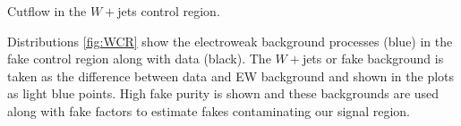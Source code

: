 \begin{table}[h!]
\scalebox{0.6}{

}
\caption{Cutflow in the $W+$jets control region.}
\label{tab:fakescr}
\end{table}

Distributions \ref{fig:WCR} show the electroweak background processes (blue) in the fake control region along with data (black). The $W+$jets or fake background is taken as the difference between data and EW background and shown in the plots as light blue points. High fake purity is shown and these backgrounds are used along with fake factors to estimate fakes contaminating our signal region.

\begin{figure}[!h]
  \hfill
  \hfill
  \hfill
\end{figure}
